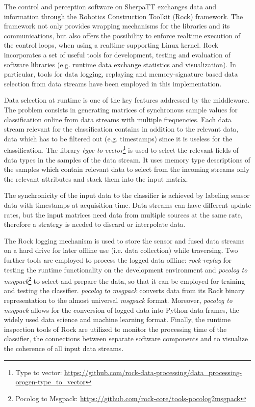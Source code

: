 The control and perception software on SherpaTT exchanges data and information through the Robotics Construction Toolkit (Rock) framework. 
The framework not only provides wrapping mechanisms for the libraries and its communications, but also offers the possibility to enforce realtime execution of the control loops, when using a realtime supporting Linux kernel. 
Rock incorporates a set of useful tools for development, testing and evaluation of software libraries (e.g. runtime data exchange statistics and visualization). 
In particular, tools for data logging, replaying and memory-signature based data selection from data streams have been employed in this implementation. 

Data selection at runtime is one of the key features addressed by the middleware. 
The problem consists in generating matrices of synchronous sample values for classification online from data streams with multiple frequencies.
Each data stream relevant for the classification contains in addition to the relevant data, data which has to be filtered out (e.g. timestamps) since it is useless for the classification.
The library \emph{type to vector}\footnote{Type to vector: \url{https://github.com/rock-data-processing/data_processing-orogen-type_to_vector}} is used to select the relevant fields of data types in the samples of the data stream. 
It uses memory type descriptions of the samples which contain relevant data to select from the incoming streams only the relevant attributes and stack them into the input matrix. 

The synchronicity of the input data to the classifier is achieved by labeling sensor data with timestamps at acquisition time.
Data streams can have different update rates, but the input matrices need data from multiple sources at the same rate, therefore a strategy is needed to discard or interpolate data. 

The Rock logging mechanism is used to store the sensor and fused data streams on a hard drive for later offline use (i.e. data collection) while traversing. 
Two further tools are employed to process the logged data offline: \emph{rock-replay} for testing the runtime functionality on the development environment and \emph{pocolog to msgpack}\footnote{Pocolog to Msgpack: \url{https://github.com/rock-core/tools-pocolog2msgpack}} to select and prepare the data, so that it can be employed for training and testing the classifier.
\emph{pocolog to msgpack} converts data from its Rock binary representation to the almost universal \emph{msgpack} format.
Moreover, \emph{pocolog to msgpack} allows for the conversion of logged data into Python data frames, the widely used data science and machine learning format. 
Finally, the runtime inspection tools of Rock are utilized to monitor the processing time of the classifier, the connections between separate software components and to visualize the coherence of all input data streams. 

